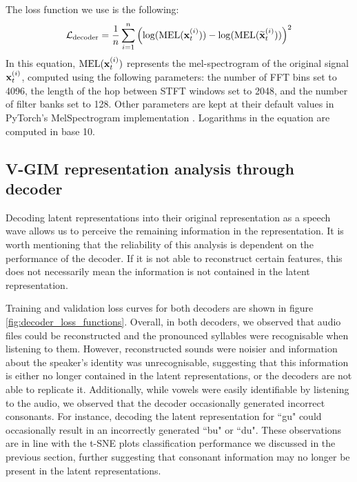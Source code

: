 		The loss function we use is the following:
		$$
		\mathcal{L}_{\text{decoder}} =\frac{1}{n} \sum_{i=1}^n\left( \log (\text{MEL} (\mathbf{x}_t^{(i)})) -\log (\text{MEL} (\widetilde{\mathbf{x}}_t^{(i)} )) \right)^2
		$$
		In this equation, $\text{MEL} (\mathbf{x}_t^{(i)})$ represents the mel-spectrogram of the original signal $\mathbf{x}_t^{(i)}$, computed using the following parameters: the number of FFT bins set to 4096, the length of the hop between STFT windows set to 2048, and the number of filter banks set to 128. Other parameters are kept at their default values in PyTorch's MelSpectrogram implementation \citep{paszkeAutomaticDifferentiationPyTorch2017}. Logarithms in the equation are computed in base 10.
		
		
		
		

			
	\subsection{V-GIM representation analysis through decoder}
		Decoding latent representations into their original representation as a speech wave allows us to perceive the remaining information in the representation. It is worth mentioning that the reliability of this analysis is dependent on the performance of the decoder. If it is not able to reconstruct certain features, this does not necessarily mean the information is not contained in the latent representation. 
		
		Training and validation loss curves for both decoders are shown in figure \ref{fig:decoder_loss_functions}. Overall, in both decoders, we observed that audio files could be reconstructed and the pronounced syllables were recognisable when listening to them. However, reconstructed sounds were noisier and information about the speaker's identity was unrecognisable, suggesting that this information is either no longer contained in the latent representations, or the decoders are not able to replicate it. Additionally, while vowels were easily identifiable by listening to the audio, we observed that the decoder occasionally generated incorrect consonants. For instance, decoding the latent representation for ``gu" could occasionally result in an incorrectly generated ``bu" or ``du". These observations are in line with the t-SNE plots classification performance we discussed in the previous section, further suggesting that consonant information may no longer be present in the latent representations.
		
